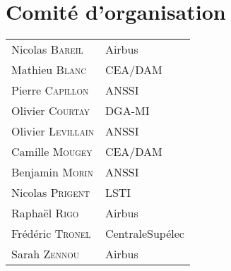 \section*{Comit\'e d'organisation}
\begin{tabular}{@{}p{5cm}@{}p{6.5cm}@{}}
  Nicolas  \textsc{Bareil}        & Airbus              \\
  Mathieu  \textsc{Blanc}         & CEA/DAM             \\
  Pierre   \textsc{Capillon}      & ANSSI               \\
  Olivier  \textsc{Courtay}       & DGA-MI              \\
  Olivier  \textsc{Levillain}     & ANSSI               \\
  Camille  \textsc{Mougey}        & CEA/DAM             \\
  Benjamin \textsc{Morin}         & ANSSI               \\
  Nicolas  \textsc{Prigent}       & LSTI                \\
  Raphaël  \textsc{Rigo}          & Airbus              \\
  Frédéric \textsc{Tronel}       & CentraleSupélec     \\
  Sarah    \textsc{Zennou}        & Airbus              \\
\end{tabular}



